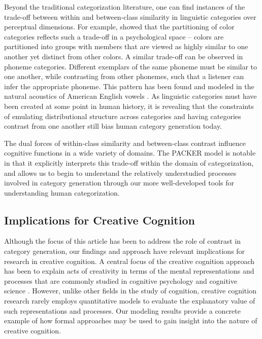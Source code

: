 \documentclass[12pt]{article}
\begin{document}
\begin{flushleft}
Beyond the traditional categorization literature, one can find instances of the trade-off between within
and between-class similarity in linguistic categories over perceptual
dimensions. For example, \cite{regier2007} showed that the partitioning of color
categories reflects such a trade-off in a psychological space -- colors are
partitioned into groups with members that are viewed as highly similar to one
another yet distinct from other colors. A similar trade-off can be observed in
phoneme categories. Different exemplars of the same phoneme must be similar to
one another, while contrasting from other phonemes, such that a listener can
infer the appropriate phoneme. This pattern has been found and modeled in the
natural acoustics of American English vowels
\citep{feldman2013,hillenbrand1995}. As linguistic categories must have been
created at some point in human history, it is revealing that the constraints of
emulating distributional structure across categories and having categories
contrast from one another still bias human category generation today.

The dual forces of within-class similarity and between-class contrast influence
cognitive functions in a wide variety of domains. The PACKER model is notable in
that it explicitly interprets this trade-off within the domain of
categorization, and allows us to begin to understand the relatively understudied
processes involved in category generation through our more well-developed tools
for understanding human categorization.

\subsection{Implications for Creative Cognition}

Although the focus of this article has been to address the role of contrast in category generation, our findings and approach have relevant implications
for research in creative cognition. A central focus of the creative cognition
approach has been to explain acts of creativity in terms of the mental
representations and processes that are commonly studied in cognitive psychology
and cognitive science \citep{finke1992creative,smith1995creative}. However,
unlike other fields in the study of cognition, creative cognition research
rarely employs quantitative models to evaluate the explanatory value of such
representations and processes. Our modeling results provide a concrete example
of how formal approaches may be used to gain insight into the nature of creative
cognition.


\end{flushleft}
\end{document}
